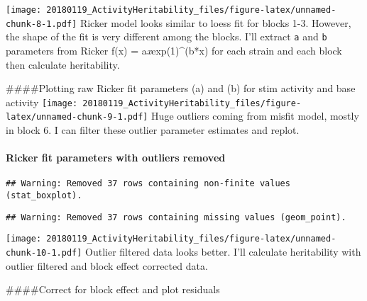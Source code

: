 \documentclass[]{article}
\let\oldparagraph\paragraph
\renewcommand{\paragraph}[1]{\oldparagraph{#1}\mbox{}}
\begin{document}
\texttt{[image: 20180119\_ActivityHeritability\_files/figure-latex/unnamed-chunk-8-1.pdf]}
Ricker model looks similar to loess fit for blocks 1-3. However, the
shape of the fit is very different among the blocks. I'll extract
\texttt{a} and \texttt{b} parameters from Ricker f(x) =
a\emph{x}exp(1)\^{}(b*x) for each strain and each block then calculate
heritability.

\#\#\#\#Plotting raw Ricker fit parameters (a) and (b) for stim activity
and base activity
\texttt{[image: 20180119\_ActivityHeritability\_files/figure-latex/unnamed-chunk-9-1.pdf]}
Huge outliers coming from misfit model, mostly in block 6. I can filter
these outlier parameter estimates and replot.

\hypertarget{ricker-fit-parameters-with-outliers-removed}{%
\paragraph{Ricker fit parameters with outliers
removed}\label{ricker-fit-parameters-with-outliers-removed}}

\begin{verbatim}
## Warning: Removed 37 rows containing non-finite values (stat_boxplot).
\end{verbatim}

\begin{verbatim}
## Warning: Removed 37 rows containing missing values (geom_point).
\end{verbatim}

\texttt{[image: 20180119\_ActivityHeritability\_files/figure-latex/unnamed-chunk-10-1.pdf]}
Outlier filtered data looks better. I'll calculate heritability with
outlier filtered and block effect corrected data.

\#\#\#\#Correct for block effect and plot residuals
\end{document}
